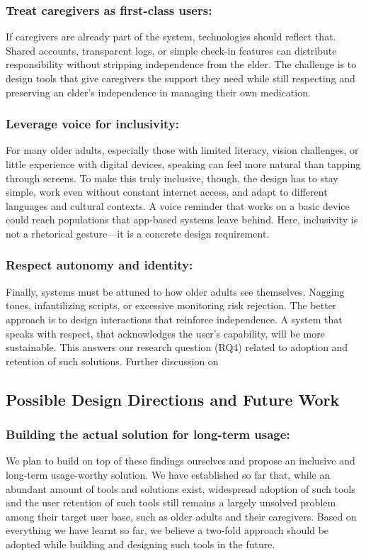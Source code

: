 \documentclass[acmlarge]{acmart}
\begin{document}
\subsubsection{Treat caregivers as first-class users: }
If caregivers are already part of the system, technologies should
reflect that. Shared accounts, transparent logs, or simple check-in
features can distribute responsibility without stripping independence
from the elder. The challenge is to design tools that give caregivers
the support they need while still respecting and preserving an elder's
independence in managing their own medication.

\subsubsection{Leverage voice for inclusivity: }
For many older adults, especially those with limited literacy, vision
challenges, or little experience with digital devices, speaking can feel
more natural than tapping through screens. To make this truly inclusive,
though, the design has to stay simple, work even without constant
internet access, and adapt to different languages and cultural contexts.
A voice reminder that works on a basic device could reach populations
that app-based systems leave behind. Here, inclusivity is not a
rhetorical gesture---it is a concrete design requirement.

\subsubsection{Respect autonomy and identity: }
Finally, systems must be attuned to how older adults see themselves.
Nagging tones, infantilizing scripts, or excessive monitoring risk
rejection. The better approach is to design interactions that reinforce
independence.\cite{10.1145/3550321} A system that speaks with respect, that
acknowledges the user's capability, will be more sustainable. This
answers our research question (RQ4) related to adoption and retention of
such solutions. Further discussion on

\subsection{Possible Design Directions and
Future Work}
\subsubsection{Building the actual solution for long-term usage: }
We plan to build on top of these findings ourselves and propose an
inclusive and long-term usage-worthy solution. We have established so
far that, while an abundant amount of tools and solutions exist,
widespread adoption of such tools and the user retention of such tools
still remains a largely unsolved problem among their target user base,
such as older adults and their caregivers. Based on everything we have
learnt so far, we believe a two-fold approach should be adopted while
building and designing such tools in the future.
\end{document}
